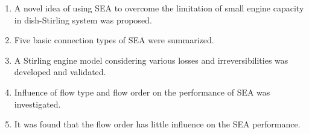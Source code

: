 \documentclass[12pt]{letter}
\begin{document}
\begin{enumerate}
\item A novel idea of using SEA to overcome the limitation of small engine capacity in dish-Stirling system was proposed.

\item Five basic connection types of SEA were summarized.

\item A Stirling engine model considering various losses and irreversibilities was developed and validated.

\item Influence of flow type and flow order on the performance of SEA was investigated.

\item It was found that the flow order has little influence on the SEA performance.
\end{enumerate}
\end{document}
